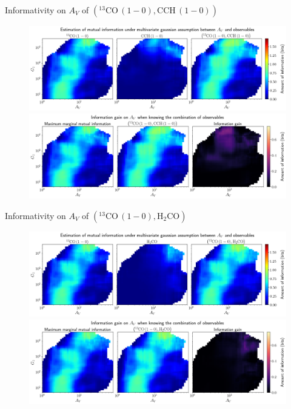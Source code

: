 \documentclass{beamer}
\begin{document}
\begin{frame}{Informativity on $A_V$ of $\left(\mathrm{^{13}CO\,(1-0)},\mathrm{CCH\,(1-0)}\right)$}
    \begin{figure}
        \centering
        \includegraphics[width=0.95\linewidth]{../linearinfogauss/av__13co10_cch10_linearinfogauss.png}
        \vfill
        \includegraphics[width=0.95\linewidth]{../linearinfogauss/av__13co10_cch10_linearinfogauss_gain.png}
    \end{figure}
\end{frame}

\begin{frame}{Informativity on $A_V$ of $\left(\mathrm{^{13}CO\,(1-0)},\mathrm{H_2CO}\right)$}
    \begin{figure}
        \centering
        \includegraphics[width=0.95\linewidth]{../linearinfogauss/av__13co10_h2co_linearinfogauss.png}
        \vfill
        \includegraphics[width=0.95\linewidth]{../linearinfogauss/av__13co10_h2co_linearinfogauss_gain.png}
    \end{figure}
\end{frame}
\end{document}
